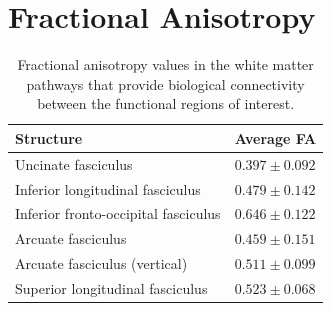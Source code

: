 \section{Fractional Anisotropy}
\label{appb}
\begin{table}[h]
\begin{center}
\begin{tabular}{| l | l |}
\hline
Structure & Average FA\\
\hline
Uncinate fasciculus & $ 0.397 \pm 0.092$\\
Inferior longitudinal fasciculus & $ 0.479 \pm 0.142$\\
Inferior fronto-occipital fasciculus & $ 0.646 \pm 0.122$\\
Arcuate fasciculus & $ 0.459 \pm 0.151$\\
Arcuate fasciculus (vertical) & $ 0.511 \pm 0.099$\\
Superior longitudinal fasciculus & $ 0.523 \pm 0.068$\\
\hline
\end{tabular}
\caption{Fractional anisotropy values in the white matter pathways that provide biological connectivity between the functional regions of interest.}
\label{table:connect}
\end{center}
\end{table}

